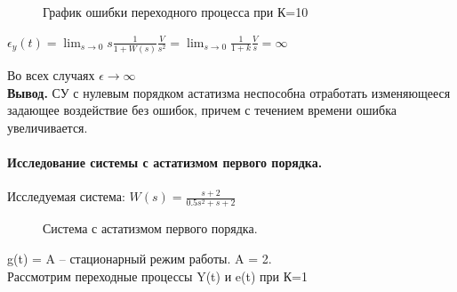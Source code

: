 \documentclass[a4paper, 11pt]{article}
\begin{document}
\newpage

\begin{figure}[h!]
    \caption{График ошибки переходного процесса при К=10}
    \label{tree}
\end{figure}

$\epsilon_y(t)=\lim_{s\to0}s\frac{1}{1+W(s)}\frac{V}{s^2}=\lim_{s\to0}\frac{1}{1+k}\frac{V}{s}=\infty$

Во всех случаях $\epsilon\to\infty$ \\

\textbf{Вывод.} СУ с нулевым порядком астатизма неспособна отработать изменяющееся задающее воздействие без ошибок, причем с течением времени ошибка увеличивается.
\newpage
\paragraph{Исследование системы с астатизмом первого порядка.}

Исследуемая система: \large{$W(s)=\frac{s+2}{0.5s^2+s+2}$}


\begin{figure}[h!]
    \caption{Система с астатизмом первого порядка.}
    \label{one}
\end{figure}

g(t) = A – стационарный режим работы. A = 2.\\

Рассмотрим переходные процессы Y(t) и e(t) при К=1
\end{document}
